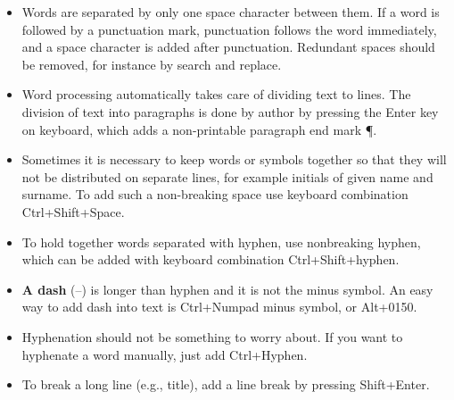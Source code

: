 \begin{itemize}
\item Words are separated by only one space character between them. If a word is followed by a punctuation mark, punctuation follows the word immediately, and a space character is added after punctuation. Redundant spaces should be removed, for instance by search and replace.

\item Word processing automatically takes care of dividing text to lines. The division of text into paragraphs is done by author by pressing the Enter key on keyboard,
which adds a non-printable paragraph end mark ¶.

\item Sometimes it is necessary to keep words or symbols together so that they will not
be distributed on separate lines, for example initials of given name and surname. To add such a non-breaking space use keyboard combination Ctrl+Shift+Space.

\item To hold together words separated with hyphen, use nonbreaking hyphen, which can be added with keyboard combination Ctrl+Shift+hyphen.

\item \textbf{A dash} (--) is longer than hyphen and it is not the minus symbol. An easy way to
add dash into text is Ctrl+Numpad minus symbol, or Alt+0150.

\item Hyphenation should not be something to worry about. If you want to hyphenate a
word manually, just add Ctrl+Hyphen.

\item To break a long line (e.g., title), add a line break by pressing Shift+Enter.
\end{itemize}